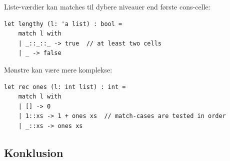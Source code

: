 \documentclass[rgb]{beamer}
\begin{document}
\begin{frame}[fragile]
\begin{footnotesize}


  \vspace{1ex}

  Liste-værdier kan matches til dybere niveauer end første cons-celle:

    \vspace{1ex}

\begin{lstlisting}[numbers=none,frame=none,mathescape]
  let lengthy (l: 'a list) : bool =
    match l with
    | _::_::_ -> true  // at least two cells
    | _ -> false
\end{lstlisting}

    \vspace{1ex}

  Mønstre kan være mere komplekse:
  \vspace{1ex}
\begin{lstlisting}[numbers=none,frame=none,mathescape]
  let rec ones (l: int list) : int =
    match l with
    | [] -> 0
    | 1::xs -> 1 + ones xs  // match-cases are tested in order
    | _::xs -> ones xs
\end{lstlisting}

\end{footnotesize}
\end{frame}

\subsection*{Konklusion}
\begin{frame}[fragile]

  \vspace{3mm}
  \tableofcontents
\end{frame}
\end{document}
